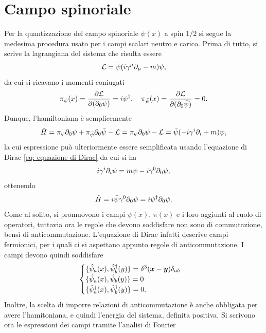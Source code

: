 \section{Campo spinoriale}
Per la quantizzazione del campo spinoriale $\psi(x)$ a spin $1/2$ si segue la medesima procedura usato per i campi scalari neutro e carico. Prima di tutto, si scrive la lagrangiana del sistema che risulta essere
\begin{equation}
    \mathcal{L} = \bar{\psi}(i\gamma^\mu\partial_\mu - m)\psi,
\end{equation}
da cui si ricavano i momenti coniugati
\begin{equation}
    \pi_\psi(x) = \frac{\partial\mathcal{L}}{\partial(\partial_0\psi)} = i\psi^\dagger,\quad\pi_{\bar{\psi}}(x) = \frac{\partial\mathcal{L}}{\partial(\partial_0\bar{\psi})} = 0.
\end{equation}
Dunque, l'hamiltoniana è semplicemente
\begin{equation}
    \hat{H} = \pi_\psi\partial_0\psi + \pi_{\bar{\psi}}\partial_0\bar{\psi} -\mathcal{L} = \pi_\psi\partial_0\psi -\mathcal{L} = \bar{\psi}(-i\gamma^i\partial_i + m)\psi,
\end{equation}
la cui espressione può ulteriormente essere semplificata usando l'equazione di Dirac \eqref{eq: equazione di Dirac} da cui si ha
\begin{equation}
    i\gamma^i\partial_i\psi = m\psi - i\gamma^0\partial_0\psi,
\end{equation}
ottenendo
\begin{equation}
\label{eq: hamiltoniana campo spinoriale pre-sostituzione campi}
    \hat{H} = i\bar{\psi}\gamma^0\partial_0\psi = i\psi^\dagger\partial_0\psi.
\end{equation}
Come al solito, si promuovono i campi $\psi(x)$, $\pi(x)$ e i loro aggiunti al ruolo di operatori, tuttavia ora le regole che devono soddisfare non sono di commutazione, bensì di anticommutazione. L'equazione di Dirac infatti descrive campi fermionici, per i quali ci si aspettano appunto regole di anticommutazione. I campi devono quindi soddisfare
\begin{equation}
    \begin{cases}
        \{\hat{\psi}_a(x),\hat{\psi}^\dagger_{b}(y)\} = \delta^3(\bm{x} - \bm{y})\delta_{ab} \\
        \{\hat{\psi}_a(x),\hat{\psi}_{b}(y)\} = 0 \\
        \{\hat{\psi}^\dagger_a(x),\hat{\psi}^\dagger_{b}(y)\} = 0.
    \end{cases}
\end{equation}
Inoltre, la scelta di imporre relazioni di anticommutazione è anche obbligata per avere l'hamitoniana, e quindi l'energia del sistema, definita positiva. Si scrivono ora le espressioni dei campi tramite l'analisi di Fourier

